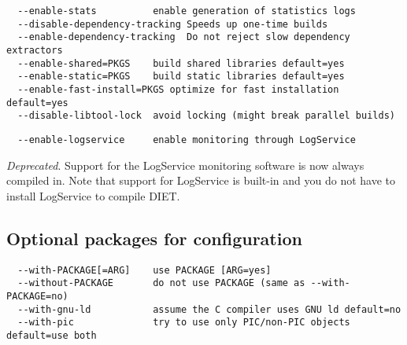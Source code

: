 {\footnotesize
\begin{verbatim}
  --enable-stats          enable generation of statistics logs
  --disable-dependency-tracking Speeds up one-time builds
  --enable-dependency-tracking  Do not reject slow dependency extractors
  --enable-shared=PKGS    build shared libraries default=yes
  --enable-static=PKGS    build static libraries default=yes
  --enable-fast-install=PKGS optimize for fast installation default=yes
  --disable-libtool-lock  avoid locking (might break parallel builds)
\end{verbatim}
}

{\footnotesize
\begin{verbatim}
  --enable-logservice     enable monitoring through LogService
\end{verbatim}
}
\noindent \textit{Deprecated}.  Support for the LogService monitoring
software is now always compiled in.  Note that support for LogService
is built-in and you do not have to install LogService to compile
DIET.

\subsection{Optional packages for configuration}


{\footnotesize
\begin{verbatim}
  --with-PACKAGE[=ARG]    use PACKAGE [ARG=yes]
  --without-PACKAGE       do not use PACKAGE (same as --with-PACKAGE=no)
  --with-gnu-ld           assume the C compiler uses GNU ld default=no
  --with-pic              try to use only PIC/non-PIC objects default=use both
\end{verbatim}
}




